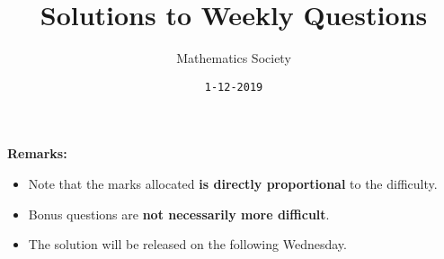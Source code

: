 \documentclass[addpoints]{exam}
\title{Solutions to Weekly Questions}
\author{Mathematics Society}
\date{\texttt{1-12-2019}}
\begin{document}


\maketitle


\textbf{Remarks:}
\begin{itemize}
    \item Note that the marks allocated \textbf{is directly proportional} to the difficulty.
    \item Bonus questions are \textbf{not necessarily more difficult}.
    \item The solution will be released on the following Wednesday.
\end{itemize}



\end{document}
